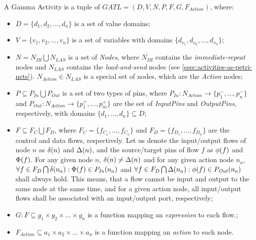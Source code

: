 \begin{definition}
	A Gamma Activity is a tuple of \(\mathit{GATL} = (D, V, N, P, F, G, F_{Action})\), where:
	
	\begin{itemize}
		\item \(D = \{ d_{1}, d_{2}, \dots, d_{n} \} \) is a set of value domains;
		\item \(V = \{ v_1, v_2, \dots, v_n \} \) is a set of variables with domains \( \{d_{v_1}, d_{v_2}, \dots, d_{v_n} \} \);
		\item \(N = N_\mathit{IR} \bigcup N_\mathit{LAS} \) is a set of \emph{Nodes}, where \(N_\mathit{IR}\) contains the \emph{immediate-repeat} nodes and \(N_\mathit{LAS}\) contains the \emph{load-and-send} nodes (see \autoref{ssec:activities-as-petri-nets}). \(N_\mathit{Action} \in N_\mathit{LAS} \) is a special set of nodes, which are the \emph{Action} nodes;
		\item \( P \subseteq P_\mathit{In} \bigcup P_\mathit{Out} \) is a set of two types of pins, where \(P_\mathit{In} : N_\mathit{Action} \rightarrow \{ p^-_1, \dots, p^-_n \} \) and \(P_\mathit{Out} : N_\mathit{Action} \rightarrow \{ p^+_1, \dots, p^+_m \} \) are the set of \emph{InputPins} and \emph{OutputPins}, respectively, with domains \(\{ d_1, \dots, d_n \} \subseteq D \);
		\item \( F \subseteq F_C \bigcup F_D \), where \(F_C = \{ f_{C_1}, \dots, f_{C_n} \} \) and \(F_D = \{ f_{D_1}, \dots, f_{D_n} \} \) are the control and data flows, respectively. Let us denote the input/output flows of node \(n\) as \( \delta(n) \) and \( \Delta(n) \), and the source/target pins of flow \(f\) as \( \phi(f) \) and \(\Phi(f)\). For any given node \(n\), \( \delta(n) \neq \Delta(n) \) and for any given action node \(n_a\), \( \forall f \in F_D \bigcap \delta(n_a) : \Phi(f) \in P_\mathit{In}(n_a) \) and \( \forall f \in F_D \bigcap \Delta(n_a) : \phi(f) \in P_\mathit{Out}(n_a) \) shall always hold. This means, that a flow cannot be input and output to the same node at the same time, and for a given action node, all input/output flows shall be associated with an input/output port, respectively;
		\item \(G : F \subseteq g_1 \times g_2 \times \dots \times g_n \) is a function mapping an \emph{expression} to each flow.;
		\item \(F_{Action} \subseteq a_{1} \times a_{2} \times \dots \times a_{n} \) is a function mapping an \emph{action} to each node.
	\end{itemize}
	

\end{definition}
